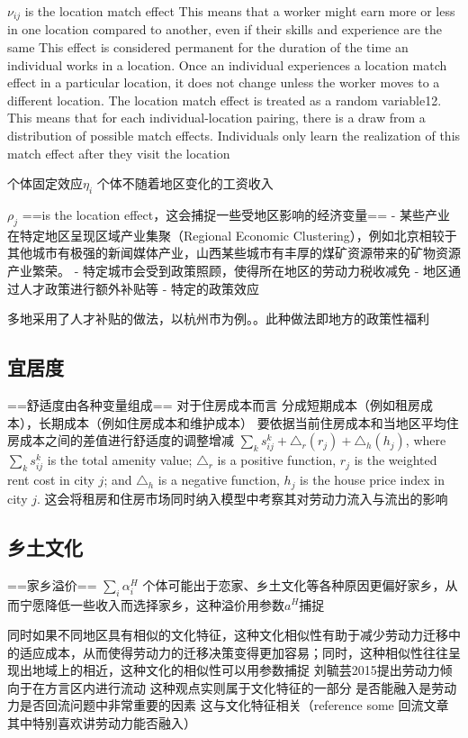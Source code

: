 \documentclass{article}
\numberwithin{equation}{section} %
\begin{document}
$\nu_{ij}$ is the location match effect
This means that a worker might earn more or less in one location compared to another, even if their skills and experience are the same
This effect is considered permanent for the duration of the time an individual works in a location. Once an individual experiences a location match effect in a particular location, it does not change unless the worker moves to a different location.
The location match effect is treated as a random variable12. This means that for each individual-location pairing, there is a draw from a distribution of possible match effects. Individuals only learn the realization of this match effect after they visit the location



个体固定效应$\eta_i$
个体不随着地区变化的工资收入



$\rho_j$ ==is the location effect，这会捕捉一些受地区影响的经济变量==
- 某些产业在特定地区呈现区域产业集聚（Regional Economic Clustering），例如北京相较于其他城市有极强的新闻媒体产业，山西某些城市有丰厚的煤矿资源带来的矿物资源产业繁荣。
- 特定城市会受到政策照顾，使得所在地区的劳动力税收减免
- 地区通过人才政策进行额外补贴等
- 特定的政策效应

多地采用了人才补贴的做法，以杭州市为例。。此种做法即地方的政策性福利

\subsection{宜居度}
==舒适度由各种变量组成==
对于住房成本而言
分成短期成本（例如租房成本），长期成本（例如住房成本和维护成本）
要依据当前住房成本和当地区平均住房成本之间的差值进行舒适度的调整增减
$\sum\limits_{k}s^k_{ij}+\triangle_r(r_j)+\triangle_h(h_j)$, where $\sum\limits_{k}s^k_{ij}$ is the total amenity value; $\triangle_r$ is a positive function, $r_j$ is the weighted rent cost in city $j$; and $\triangle_h$ is a negative function, $h_j$ is the house price index in city $j$.
这会将租房和住房市场同时纳入模型中考察其对劳动力流入与流出的影响


\subsection{乡土文化}
==家乡溢价== $\sum\limits_{i}\alpha^{H}_{i}$
个体可能出于恋家、乡土文化等各种原因更偏好家乡，从而宁愿降低一些收入而选择家乡，这种溢价用参数$a^H$捕捉

同时如果不同地区具有相似的文化特征，这种文化相似性有助于减少劳动力迁移中的适应成本，从而使得劳动力的迁移决策变得更加容易；同时，这种相似性往往呈现出地域上的相近，这种文化的相似性可以用参数捕捉
刘毓芸2015提出劳动力倾向于在方言区内进行流动 这种观点实则属于文化特征的一部分
是否能融入是劳动力是否回流问题中非常重要的因素 这与文化特征相关（reference some 回流文章 其中特别喜欢讲劳动力能否融入）
\end{document}
